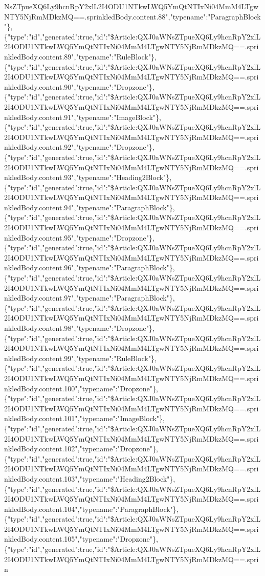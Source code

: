 NsZTpueXQ6Ly9hcnRpY2xlL2I4ODU1NTkwLWQ5YmQtNTIxNi04MmM4LTgwNTY5NjRmMDkzMQ==.sprinkledBody.content.88","typename":"ParagraphBlock"\},\{"type":"id","generated":true,"id":"\$Article:QXJ0aWNsZTpueXQ6Ly9hcnRpY2xlL2I4ODU1NTkwLWQ5YmQtNTIxNi04MmM4LTgwNTY5NjRmMDkzMQ==.sprinkledBody.content.89","typename":"RuleBlock"\},\{"type":"id","generated":true,"id":"\$Article:QXJ0aWNsZTpueXQ6Ly9hcnRpY2xlL2I4ODU1NTkwLWQ5YmQtNTIxNi04MmM4LTgwNTY5NjRmMDkzMQ==.sprinkledBody.content.90","typename":"Dropzone"\},\{"type":"id","generated":true,"id":"\$Article:QXJ0aWNsZTpueXQ6Ly9hcnRpY2xlL2I4ODU1NTkwLWQ5YmQtNTIxNi04MmM4LTgwNTY5NjRmMDkzMQ==.sprinkledBody.content.91","typename":"ImageBlock"\},\{"type":"id","generated":true,"id":"\$Article:QXJ0aWNsZTpueXQ6Ly9hcnRpY2xlL2I4ODU1NTkwLWQ5YmQtNTIxNi04MmM4LTgwNTY5NjRmMDkzMQ==.sprinkledBody.content.92","typename":"Dropzone"\},\{"type":"id","generated":true,"id":"\$Article:QXJ0aWNsZTpueXQ6Ly9hcnRpY2xlL2I4ODU1NTkwLWQ5YmQtNTIxNi04MmM4LTgwNTY5NjRmMDkzMQ==.sprinkledBody.content.93","typename":"Heading2Block"\},\{"type":"id","generated":true,"id":"\$Article:QXJ0aWNsZTpueXQ6Ly9hcnRpY2xlL2I4ODU1NTkwLWQ5YmQtNTIxNi04MmM4LTgwNTY5NjRmMDkzMQ==.sprinkledBody.content.94","typename":"ParagraphBlock"\},\{"type":"id","generated":true,"id":"\$Article:QXJ0aWNsZTpueXQ6Ly9hcnRpY2xlL2I4ODU1NTkwLWQ5YmQtNTIxNi04MmM4LTgwNTY5NjRmMDkzMQ==.sprinkledBody.content.95","typename":"Dropzone"\},\{"type":"id","generated":true,"id":"\$Article:QXJ0aWNsZTpueXQ6Ly9hcnRpY2xlL2I4ODU1NTkwLWQ5YmQtNTIxNi04MmM4LTgwNTY5NjRmMDkzMQ==.sprinkledBody.content.96","typename":"ParagraphBlock"\},\{"type":"id","generated":true,"id":"\$Article:QXJ0aWNsZTpueXQ6Ly9hcnRpY2xlL2I4ODU1NTkwLWQ5YmQtNTIxNi04MmM4LTgwNTY5NjRmMDkzMQ==.sprinkledBody.content.97","typename":"ParagraphBlock"\},\{"type":"id","generated":true,"id":"\$Article:QXJ0aWNsZTpueXQ6Ly9hcnRpY2xlL2I4ODU1NTkwLWQ5YmQtNTIxNi04MmM4LTgwNTY5NjRmMDkzMQ==.sprinkledBody.content.98","typename":"Dropzone"\},\{"type":"id","generated":true,"id":"\$Article:QXJ0aWNsZTpueXQ6Ly9hcnRpY2xlL2I4ODU1NTkwLWQ5YmQtNTIxNi04MmM4LTgwNTY5NjRmMDkzMQ==.sprinkledBody.content.99","typename":"RuleBlock"\},\{"type":"id","generated":true,"id":"\$Article:QXJ0aWNsZTpueXQ6Ly9hcnRpY2xlL2I4ODU1NTkwLWQ5YmQtNTIxNi04MmM4LTgwNTY5NjRmMDkzMQ==.sprinkledBody.content.100","typename":"Dropzone"\},\{"type":"id","generated":true,"id":"\$Article:QXJ0aWNsZTpueXQ6Ly9hcnRpY2xlL2I4ODU1NTkwLWQ5YmQtNTIxNi04MmM4LTgwNTY5NjRmMDkzMQ==.sprinkledBody.content.101","typename":"ImageBlock"\},\{"type":"id","generated":true,"id":"\$Article:QXJ0aWNsZTpueXQ6Ly9hcnRpY2xlL2I4ODU1NTkwLWQ5YmQtNTIxNi04MmM4LTgwNTY5NjRmMDkzMQ==.sprinkledBody.content.102","typename":"Dropzone"\},\{"type":"id","generated":true,"id":"\$Article:QXJ0aWNsZTpueXQ6Ly9hcnRpY2xlL2I4ODU1NTkwLWQ5YmQtNTIxNi04MmM4LTgwNTY5NjRmMDkzMQ==.sprinkledBody.content.103","typename":"Heading2Block"\},\{"type":"id","generated":true,"id":"\$Article:QXJ0aWNsZTpueXQ6Ly9hcnRpY2xlL2I4ODU1NTkwLWQ5YmQtNTIxNi04MmM4LTgwNTY5NjRmMDkzMQ==.sprinkledBody.content.104","typename":"ParagraphBlock"\},\{"type":"id","generated":true,"id":"\$Article:QXJ0aWNsZTpueXQ6Ly9hcnRpY2xlL2I4ODU1NTkwLWQ5YmQtNTIxNi04MmM4LTgwNTY5NjRmMDkzMQ==.sprinkledBody.content.105","typename":"Dropzone"\},\{"type":"id","generated":true,"id":"\$Article:QXJ0aWNsZTpueXQ6Ly9hcnRpY2xlL2I4ODU1NTkwLWQ5YmQtNTIxNi04MmM4LTgwNTY5NjRmMDkzMQ==.sprin